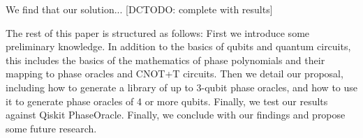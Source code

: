 We find that our solution... [DCTODO: complete with results]

The rest of this paper is structured as follows: First we introduce
some preliminary knowledge. In addition to the basics of qubits and
quantum circuits, this includes the basics of the mathematics of
phase polynomials and their mapping to phase oracles and CNOT+T
circuits. Then we detail our proposal, including how to generate
a library of up to 3-qubit phase oracles, and how to use it to generate
phase oracles of 4 or more qubits. Finally, we test our results against
Qiskit PhaseOracle. Finally, we conclude with our findings and propose
some future research.

